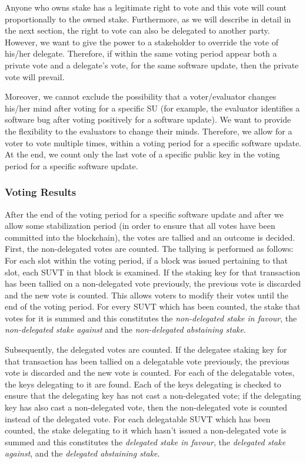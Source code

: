 Anyone who owns stake has a legitimate right to vote and this vote will count
proportionally to the owned stake. Furthermore, as we will describe in detail in
the next section, the right to vote can also be delegated to another party.
However, we want to give the power to a stakeholder to override the vote of
his/her delegate. Therefore, if within the same voting period appear both a
private vote and a delegate's vote, for the same software update, then the
private vote will prevail.

Moreover, we cannot exclude the possibility that a voter/evaluator changes
his/her mind after voting for a specific SU (for example, the evaluator
identifies a software bug after voting positively for a software update). We
want to provide the flexibility to the evaluators to change their minds.
Therefore, we allow for a voter to vote multiple times, within a voting period
for a specific software update. At the end, we count only the last vote of a
specific public key in the voting period for a specific software update.

\subsubsection{Voting Results}
After the end of the voting period for a specific software update and after we
allow some stabilization period (in order to ensure that all votes have been
committed into the blockchain), the votes are tallied and an outcome is decided.
First, the non-delegated votes are counted. The tallying is performed as
follows: For each slot within the voting period, if a block was issued
pertaining to that slot, each SUVT in that block is examined. If the staking key
for that transaction has been tallied on a non-delegated vote previously, the
previous vote is discarded and the new vote is counted. This allows voters to
modify their votes until the end of the voting period. For every SUVT which has
been counted, the stake that votes for it is summed and this constitutes the
\emph{non-delegated stake in favour}, the \emph{non-delegated stake against} and
the \emph{non-delegated abstaining stake}.

Subsequently, the delegated votes are counted. If the delegatee staking key for
that transaction has been tallied on a delegatable vote previously, the previous
vote is discarded and the new vote is counted. For each of the delegatable
votes, the keys delegating to it are found. Each of the keys delegating is
checked to ensure that the delegating key has not cast a non-delegated vote; if
the delegating key has also cast a non-delegated vote, then the non-delegated
vote is counted instead of the delegated vote. For each delegatable SUVT which
has been counted, the stake delegating to it which hasn't issued a non-delegated
vote is summed and this constitutes the \emph{delegated stake in favour}, the
\emph{delegated stake against}, and the \emph{delegated abstaining stake}.


